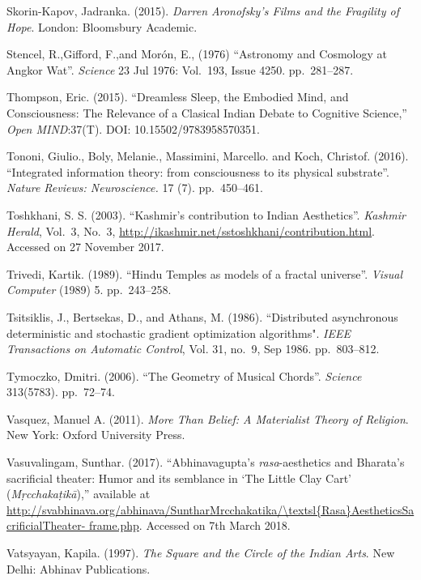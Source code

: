 \begin{thebibliography}{99}
Skorin-Kapov, Jadranka. (2015). \textsl{Darren Aronofsky's Films and the Fragility of Hope}. London: Bloomsbury Academic.

Stencel, R.,Gifford, F.,and Morón, E., (1976) “Astronomy and Cosmology at Angkor Wat”. \textsl{Science} 23 Jul 1976: Vol.~193, Issue 4250. pp.~281--287.

Thompson, Eric. (2015). “Dreamless Sleep, the Embodied Mind, and Consciousness: The Relevance of a Clasical Indian Debate to Cognitive Science,” \textsl{Open MIND}:37(T). DOI: 10.15502/9783958570351.

Tononi, Giulio., Boly, Melanie., Massimini, Marcello. and Koch, Christof. (2016). “Integrated information theory: from consciousness to its physical substrate”. \textsl{Nature Reviews: Neuroscience.} 17 (7). pp.~450--461.

Toshkhani, S. S. (2003). “Kashmir’s contribution to Indian Aesthetics”. \textsl{Kashmir Herald}, Vol.~3, No.~3, \url{http://ikashmir.net/sstoshkhani/contribution.html}. Accessed on 27 November 2017.

Trivedi, Kartik. (1989). “Hindu Temples as models of a fractal universe”. \textsl{Visual Computer} (1989) 5. pp.~243--258.

Tsitsiklis, J., Bertsekas, D., and Athans, M. (1986). ``Distributed asynchronous deterministic and stochastic gradient optimization algorithms". \textsl{IEEE Transactions on Automatic Control}, Vol. 31, no.~9, Sep 1986. pp.~803--812.

Tymoczko, Dmitri. (2006). “The Geometry of Musical Chords”. \textsl{Science} 313(5783). pp.~72--74.

Vasquez, Manuel A. (2011). \textsl{More Than Belief: A Materialist Theory of Religion}. New York: Oxford University Press.

Vasuvalingam, Sunthar. (2017). “Abhinavagupta’s \textsl{rasa}-aesthetics and Bharata’s sacrificial theater: Humor and its semblance in ‘The Little Clay Cart’ (\textsl{Mṛcchakaṭikā}),” available at \url{http://svabhinava.org/abhinava/SuntharMrcchakatika/\textsl{Rasa}AestheticsSacrificialTheater- frame.php}. Accessed on 7th March 2018.

Vatsyayan, Kapila. (1997). \textsl{The Square and the Circle of the Indian Arts}. New Delhi: Abhinav Publications.


\end{thebibliography}
